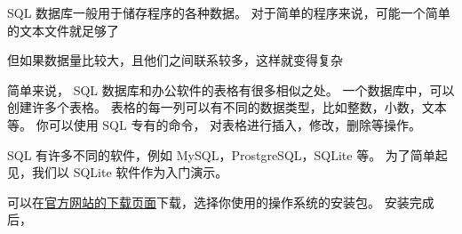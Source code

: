 
SQL 数据库一般用于储存程序的各种数据。 对于简单的程序来说，可能一个简单的文本文件就足够了

但如果数据量比较大，且他们之间联系较多，这样就变得复杂

简单来说， SQL 数据库和办公软件的表格有很多相似之处。 一个数据库中，可以创建许多个表格。 表格的每一列可以有不同的数据类型，比如整数，小数，文本等。 你可以使用 SQL 专有的命令， 对表格进行插入，修改，删除等操作。

SQL 有许多不同的软件，例如 MySQL，ProstgreSQL，SQLite 等。 为了简单起见，我们以 SQLite 软件作为入门演示。

可以在\href{https://sqlitebrowser.org/dl/}{官方网站的下载页面}下载，选择你使用的操作系统的安装包。 安装完成后，







